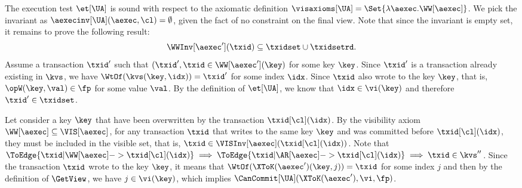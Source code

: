 The execution test \(\et[\UA]\) is sound with respect to 
the axiomatic definition \( \visaxioms[\UA] = \Set{\lambda \aexec. \WW[\aexec] } \).
We pick the invariant as \( \aexecinv[\UA]( \aexec, \cl ) = \emptyset \), 
given the fact of no constraint on the final view.
Note that since the invariant is empty set, it remains to prove the following result:
\[
   \WWInv[\aexec'](\txid) \subseteq \txidset \cup \txidsetrd .
\]
Assume a transaction \( \txid' \) such that \( (\txid', \txid \in \WW[\aexec'](\key) \) for some key \( \key \).
Since \( \txid' \) is a transaction already existing in \( \kvs \),
we have \( \WtOf(\kvs(\key, \idx)) = \txid' \) for some index \( \idx \).
Since \( \txid \) also wrote to the key \( \key \), that is,
\( \opW(\key, \val) \in \fp \) for some value \( \val \).
By the definition of \( \et[\UA] \), 
we know that \( \idx \in \vi(\key) \) and therefore \( \txid' \in \txidset \).

\COMPLETELET{\UA}
Let consider a key \( \key \) that have been overwritten by the transaction \( \txid[\cl](\idx) \).
By the visibility axiom \( \WW[\aexec] \subseteq \VIS[\aexec] \),
for any transaction \( \txid \) that writes to the same key \( \key \) 
and was committed before \( \txid[\cl](\idx) \), 
they must be included in the visible set, that is, \(\txid \in \VISInv[\aexec](\txid[\cl](\idx)) \).
Note that \( \ToEdge{\txid | \WW[\aexec]  -> \txid[\cl](\idx) } 
                \implies \ToEdge{ \txid | \AR[\aexec]  -> \txid[\cl](\idx) } 
                    \implies \txid \in \kvs''\).
Since the transaction \( \txid \) wrote to the key \( \key \),
it means that \( \WtOf(\XToK(\aexec')(\key,j)) = \txid \) for some index \( j \) and
then by the definition of \( \GetView \), we have \( j \in \vi(\key)\),
which implies \( \CanCommit[\UA](\XToK(\aexec'),\vi,\fp) \).
